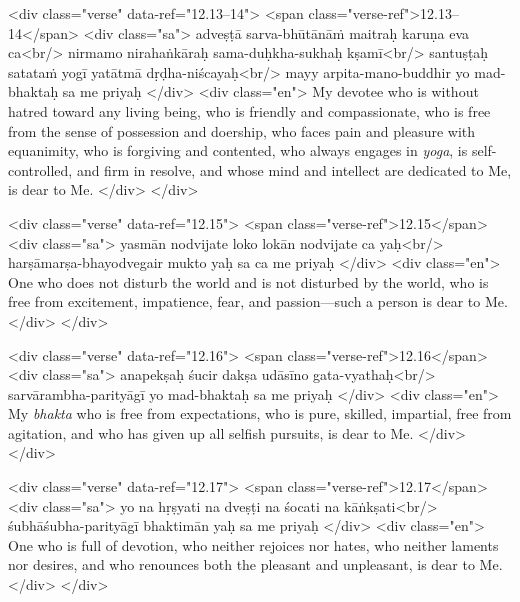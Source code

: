 \begin{html}
<div class="verse" data-ref="12.13–14">
  <span class="verse-ref">12.13–14</span>
  <div class="sa">
    adveṣṭā sarva-bhūtānāṁ maitraḥ karuṇa eva ca<br/>
    nirmamo nirahaṅkāraḥ sama-duḥkha-sukhaḥ kṣamī<br/>
    santuṣṭaḥ satataṁ yogī yatātmā dṛḍha-niścayaḥ<br/>
    mayy arpita-mano-buddhir yo mad-bhaktaḥ sa me priyaḥ
  </div>
  <div class="en">
    My devotee who is without hatred toward any living being, who is friendly and compassionate, who is free from the sense of possession and doership, who faces pain and pleasure with equanimity, who is forgiving and contented, who always engages in \textit{yoga}, is self-controlled, and firm in resolve, and whose mind and intellect are dedicated to Me, is dear to Me.
  </div>
</div>
\end{html}



\begin{html}
<div class="verse" data-ref="12.15">
  <span class="verse-ref">12.15</span>
  <div class="sa">
    yasmān nodvijate loko lokān nodvijate ca yaḥ<br/>
    harṣāmarṣa-bhayodvegair mukto yaḥ sa ca me priyaḥ
  </div>
  <div class="en">
    One who does not disturb the world and is not disturbed by the world, who is free from excitement, impatience, fear, and passion---such a person is dear to Me.
  </div>
</div>
\end{html}



\begin{html}
<div class="verse" data-ref="12.16">
  <span class="verse-ref">12.16</span>
  <div class="sa">
    anapekṣaḥ śucir dakṣa udāsīno gata-vyathaḥ<br/>
    sarvārambha-parityāgī yo mad-bhaktaḥ sa me priyaḥ
  </div>
  <div class="en">
    My \textit{bhakta} who is free from expectations, who is pure, skilled, impartial, free from agitation, and who has given up all selfish pursuits, is dear to Me.
  </div>
</div>
\end{html}



\begin{html}
<div class="verse" data-ref="12.17">
  <span class="verse-ref">12.17</span>
  <div class="sa">
    yo na hṛṣyati na dveṣṭi na śocati na kāṅkṣati<br/>
    śubhāśubha-parityāgī bhaktimān yaḥ sa me priyaḥ
  </div>
  <div class="en">
    One who is full of devotion, who neither rejoices nor hates, who neither laments nor desires, and who renounces both the pleasant and unpleasant, is dear to Me.
  </div>
</div>
\end{html}



